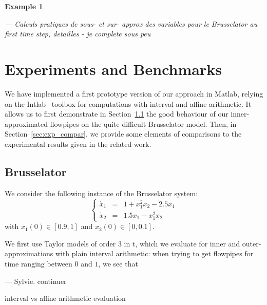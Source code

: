 \documentclass{sig-alternate-05-2015} %
\newcommand\ForAuthors[1]%
 {\par\smallskip                     %
  \begin{center}%
   \fbox%
   {\parbox{0.9\linewidth}%
    {\raggedright\sc--- #1}%
   }%
  \end{center}%
  \par\smallskip                     %
 }
\newtheorem{example}{Example}
\begin{document}
\begin{example}
\label{running3}
\ForAuthors{Calculs pratiques de sous- et sur- approx des variables pour le Brusselator au first
time step, detailles - je complete sous peu}
\end{example}

\section{Experiments and Benchmarks}
\label{sec:experiments}
We have implemented a first prototype version of our approach in Matlab, relying on the Intlab~\cite{Ru99a} 
toolbox for computations with interval and affine arithmetic.
It allows us to first demonstrate in Section~\ref{sec:exp_bruss} the good behaviour of our inner-approximated flowpipes
 on the quite difficult Brusselator model. %
Then, in Section~\ref{sec:exp_compar}, we provide some elements of comparisons to the experimental results 
given in the related work. 
 
\subsection{Brusselator}
\label{sec:exp_bruss}

We consider the following instance of the Brusselator system: 
$$\left\{\begin{array}{rcl}
\dot{x}_1 & = & 1+x_1^2x_2-2.5x_1 \\
\dot{x}_2 & = & 1.5x_1-x_1^2x_2
\end{array}\right.$$
\noindent with $x_1(0) \in [0.9,1]$ and $x_2(0) \in [0,0.1]$.

We first use Taylor models of order 3 in t, which we evaluate for inner and outer-approximations 
with plain interval arithmetic: when trying to get flowpipes for time ranging between $0$ and $1$, 
we see that
\ForAuthors{Sylvie. continuer}

 interval vs affine arithmetic evaluation
\begin{center}
\end{center}
\end{document}
